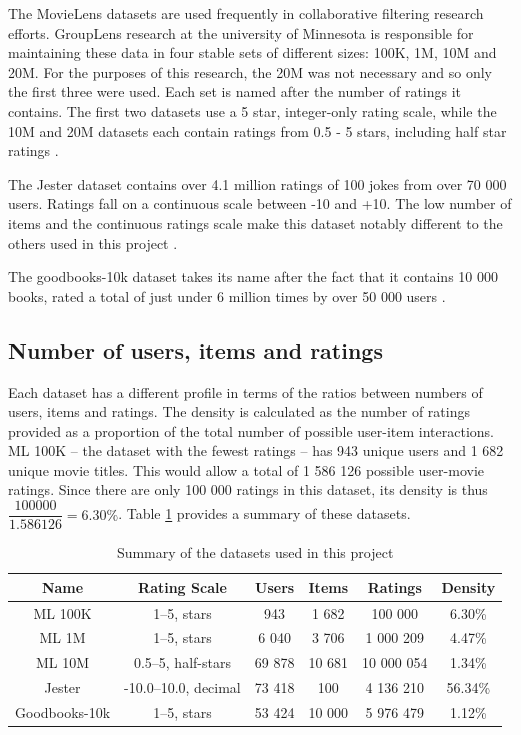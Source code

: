 The MovieLens datasets are used frequently in collaborative filtering research efforts. GroupLens research at the university of Minnesota is responsible for maintaining these data in four stable sets of different sizes: 100K, 1M, 10M and 20M. For the purposes of this research, the 20M was not necessary and so only the first three were used. Each set is named after the number of ratings it contains. The first two datasets use a 5 star, integer-only rating scale, while the 10M and 20M datasets each contain ratings from 0.5 - 5 stars, including half star ratings \parencite{harper2016movielens}.

The Jester dataset contains over 4.1 million ratings of 100 jokes from over 70 000 users. Ratings fall on a continuous scale between -10 and +10. The low number of items and the continuous ratings scale make this dataset notably different to the others used in this project \parencite{cf_1.2_eigentaste}.

The goodbooks-10k dataset takes its name after the fact that it contains 10 000 books, rated a total of just under 6 million times by over 50 000 users \parencite{goodbooks2017}.

\subsection{Number of users, items and ratings}
Each dataset has a different profile in terms of the ratios between numbers of users, items and ratings. The density is calculated as the number of ratings provided as a proportion of the total number of possible user-item interactions. ML 100K -- the dataset with the fewest ratings -- has 943 unique users and 1 682 unique movie titles. This would allow a total of 1 586 126 possible user-movie ratings. Since there are only 100 000 ratings in this dataset, its density is thus $\dfrac{100000}{1.586126} = 6.30\%$. Table \ref{tab:data-summary} provides a summary of these datasets. 

\begin{table}[H]
\caption[Data summary]{Summary of the datasets used in this project}
\label{tab:data-summary}
\centering
\begin{tabular}{c | c | c | c | c | c}
\toprule
\textbf{Name} & \textbf{Rating Scale} & \textbf{Users} & \textbf{Items} & \textbf{Ratings} & \textbf{Density} \\
\midrule
ML 100K & 1--5, stars & 943 & 1 682 & 100 000 & 6.30\% \\
ML 1M & 1--5, stars & 6 040 & 3 706 & 1 000 209 & 4.47\% \\
ML 10M & 0.5--5, half-stars & 69 878 & 10 681 & 10 000 054 & 1.34\% \\
Jester & -10.0--10.0, decimal & 73 418 & 100 & 4 136 210 & 56.34\% \\
Goodbooks-10k & 1--5, stars & 53 424 & 10 000 & 5 976 479 & 1.12\% \\
\bottomrule
\end{tabular}
\end{table}

